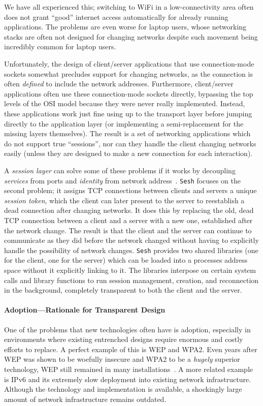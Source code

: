 \documentclass[twocolumn,11pt]{article}
\newcommand{\Sesh}{\texttt{Sesh}\xspace}
\begin{document}
We have all experienced this; switching to WiFi in a low-connectivity area often
does not grant ``good'' internet access automatically for already running
applications. The problems are even worse for laptop users, whose networking
stacks are often not designed for changing networks despite such movement being
incredibly common for laptop users.

Unfortunately, the design of client/server applications that use connection-mode
sockets somewhat precludes support for changing networks, as the connection is
often \textit{defined} to include the network addresses. Furthermore,
client/server applications often use these connection-mode sockets directly,
bypassing the top levels of the OSI model because they were never really
implemented. Instead, these applications work just fine using up to the
transport layer before jumping directly to the application layer (or
implementing a semi-replacement for the missing layers themselves). The result
is a set of networking applications which do not support true ``sessions'', nor
can they handle the client changing networks easily (unless they are designed to
make a new connection for each interaction).

A \textit{session layer} can solve some of these problems if it works by
decoupling \textit{services} from ports and \textit{identity} from network
address~\cite{wasptr-15-01,chandrashekar2003service}.
\Sesh focuses on the second problem; it assigns TCP connections between
clients and servers a unique \textit{session token}, which the client can later
present to the server to reestablish a dead connection after changing networks.
It does this by replacing the old, dead TCP connection between a client and a
server with a new one, established after the network change. The result is that
the client and the server can continue to communicate as they did before the
network changed without having to explicitly handle the possibility of network
changes. \Sesh provides two shared libraries (one for the client, one for the
server) which can be loaded into a processes address space without it
explicitly linking to it. The libraries interpose on certain system calls and
library functions to run session management, creation, and reconnection in the
background, completely transparent to both the client and the server.

\paragraph{Adoption---Rationale for Transparent Design}
One of the problems that new technologies often have is adoption, especially in environments
where existing entrenched designs require enormous and costly efforts to
replace. A perfect example of this is WEP and WPA2. Even years after WEP was
shown to be woefully insecure and WPA2 to be a \textit{hugely} superior
technology, WEP still remained in many installations~\cite{bittau2006sp}. A more
related example is IPv6 and its extremely slow deployment into existing network
infrastructure. Although the technology and implementation is available, a
shockingly large amount of network infrastructure remains outdated.
\end{document}
